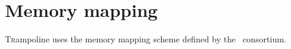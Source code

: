 
\chapter{Memory mapping}

\lettrine{T}rampoline uses the memory mapping scheme defined by the \autosar\ consortium.